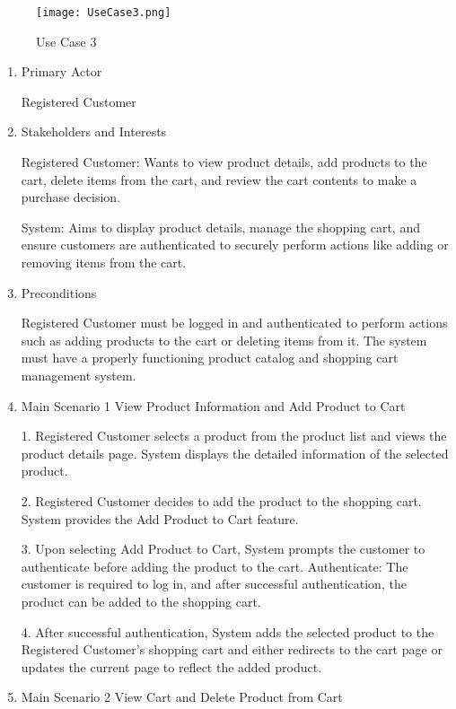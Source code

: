 \documentclass[conference]{IEEEtran}
\begin{document}
\begin{figure}[H]
    \centering
    \texttt{[image: UseCase3.png]}
    \caption{Use Case 3}
    \label{fig:use-case-3}
\end{figure}

\begin{enumerate}
\setlength{\parindent}{2ex}
\item Primary Actor

Registered Customer
\item Stakeholders and Interests

Registered Customer: Wants to view product details, add products to the cart, delete items from the cart, and review the cart contents to make a purchase decision.

System: Aims to display product details, manage the shopping cart, and ensure customers are authenticated to securely perform actions like adding or removing items from the cart.
\item Preconditions

Registered Customer must be logged in and authenticated to perform actions such as adding products to the cart or deleting items from it.
The system must have a properly functioning product catalog and shopping cart management system.
\item Main Scenario 1\newline
View Product Information and Add Product to Cart

1. Registered Customer selects a product from the product list and views the product details page.
System displays the detailed information of the selected product.

2. Registered Customer decides to add the product to the shopping cart.
System provides the Add Product to Cart feature.

3. Upon selecting Add Product to Cart, System prompts the customer to authenticate before adding the product to the cart.
Authenticate: The customer is required to log in, and after successful authentication, the product can be added to the shopping cart.

4. After successful authentication, System adds the selected product to the Registered Customer's shopping cart and either redirects to the cart page or updates the current page to reflect the added product.

\item Main Scenario 2\newline
View Cart and Delete Product from Cart


\end{enumerate}
\end{document}
